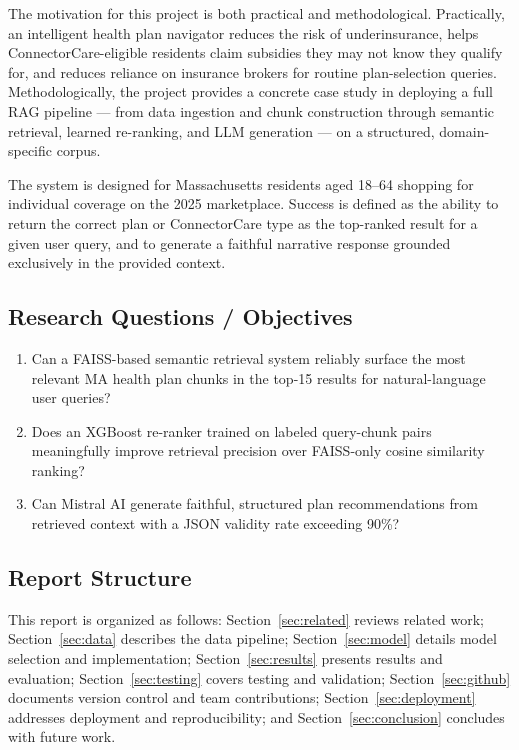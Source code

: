 \documentclass[12pt, letterpaper]{article}
\begin{document}
The motivation for this project is both practical and methodological. Practically, an intelligent health plan navigator reduces the risk of underinsurance, helps ConnectorCare-eligible residents claim subsidies they may not know they qualify for, and reduces reliance on insurance brokers for routine plan-selection queries. Methodologically, the project provides a concrete case study in deploying a full RAG pipeline --- from data ingestion and chunk construction through semantic retrieval, learned re-ranking, and LLM generation --- on a structured, domain-specific corpus.

The system is designed for Massachusetts residents aged 18--64 shopping for individual coverage on the 2025 marketplace. Success is defined as the ability to return the correct plan or ConnectorCare type as the top-ranked result for a given user query, and to generate a faithful narrative response grounded exclusively in the provided context.

\subsection{Research Questions / Objectives}

\begin{enumerate}[label=\textbf{RQ\arabic*.}]
  \item Can a FAISS-based semantic retrieval system reliably surface the most relevant MA health plan chunks in the top-15 results for natural-language user queries?
  \item Does an XGBoost re-ranker trained on labeled query-chunk pairs meaningfully improve retrieval precision over FAISS-only cosine similarity ranking?
  \item Can Mistral AI generate faithful, structured plan recommendations from retrieved context with a JSON validity rate exceeding 90\%?
\end{enumerate}

\subsection{Report Structure}

This report is organized as follows: Section~\ref{sec:related} reviews related work; Section~\ref{sec:data} describes the data pipeline; Section~\ref{sec:model} details model selection and implementation; Section~\ref{sec:results} presents results and evaluation; Section~\ref{sec:testing} covers testing and validation; Section~\ref{sec:github} documents version control and team contributions; Section~\ref{sec:deployment} addresses deployment and reproducibility; and Section~\ref{sec:conclusion} concludes with future work.
\end{document}
